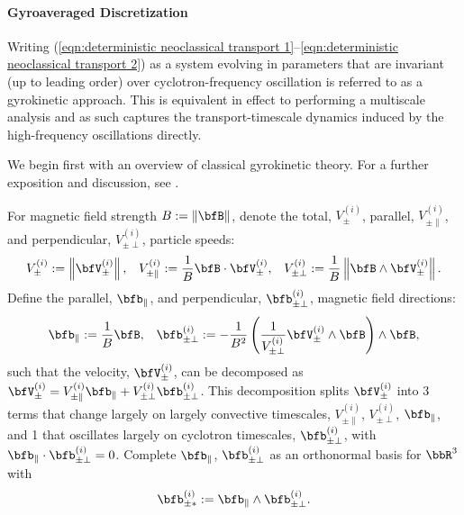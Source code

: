 \paragraph*{Gyroaveraged Discretization}
    Writing (\ref{eqn:deterministic neoclassical transport 1}--\ref{eqn:deterministic neoclassical transport 2}) as a system evolving in parameters that are invariant (up to leading order) over cyclotron-frequency oscillation is referred to as a gyrokinetic approach. This is equivalent in effect to performing a multiscale analysis \cite{Kevorkin_Cole_2012} and as such captures the transport-timescale dynamics induced by the high-frequency oscillations directly.
    
    We begin first with an overview of classical gyrokinetic theory. For a further exposition and discussion, see \cite{Woods_2006, Freidberg_2008, Chen_2015}.

    \shortline

    For magnetic field strength $B  :=  \|\bfB\|$, denote the total, $V_{\pm}^{(i)}$, parallel, $V_{\pm\parallel}^{(i)}$, and perpendicular, $V_{\pm\perp}^{(i)}$, particle speeds:
    \begin{align}
                 V_{\pm}^{(i)}  :=  \left\|\bfV_{\pm}^{(i)}\right\|,   &&
        V_{\pm\parallel}^{(i)}  :=  \frac{1}{B}\bfB\cdot\bfV_{\pm}^{(i)},  &&
            V_{\pm\perp}^{(i)}  :=  \frac{1}{B}\left\|\bfB\wedge\bfV_{\pm}^{(i)}\right\|.
    \end{align}
    Define the parallel, $\bfb_{\parallel}$, and perpendicular, $\bfb_{\pm\perp}^{(i)}$, magnetic field directions:
    \begin{align}
        \bfb_{\parallel}  :=  \frac{1}{B}\bfB,  &&
            \bfb_{\pm\perp}^{(i)}  :=  - \frac{1}{B^{2}}\left(\frac{1}{V_{\pm\perp}^{(i)}}\bfV_{\pm}^{(i)}\wedge\bfB\right)\wedge\bfB,
    \end{align}
    such that the velocity, $\bfV_{\pm}^{(i)}$, can be decomposed as $\bfV_{\pm}^{(i)}  =  V_{\pm\parallel}^{(i)}\bfb_{\parallel} + V_{\pm\perp}^{(i)}\bfb_{\pm\perp}^{(i)}$. This decomposition splits $\bfV_{\pm}^{(i)}$ into 3 terms that change largely on largely convective timescales, $V_{\pm\parallel}^{(i)}$, $V_{\pm\perp}^{(i)}$, $\bfb_{\parallel}$, and 1 that oscillates largely on cyclotron timescales, $\bfb_{\pm\perp}^{(i)}$, with $\bfb_{\parallel}\cdot\bfb_{\pm\perp}^{(i)}  =  0$. Complete $\bfb_{\parallel}$, $\bfb_{\pm\perp}^{(i)}$ as an orthonormal basis for $\bbR^{3}$ with
    \begin{equation}
        \bfb_{\pm*}^{(i)}  :=  \bfb_{\parallel}\wedge\bfb_{\pm\perp}^{(i)}.
    \end{equation}

